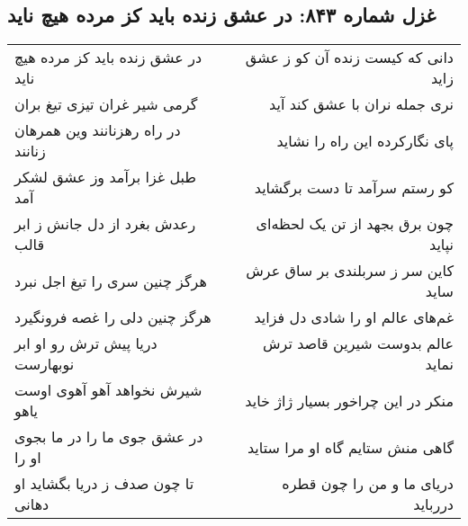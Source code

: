 \begin{center}
\section*{غزل شماره ۸۴۳: در عشق زنده باید کز مرده هیچ ناید}
\label{sec:0843}
\begin{longtable}{l p{0.5cm} r}
در عشق زنده باید کز مرده هیچ ناید
&&
دانی که کیست زنده آن کو ز عشق زاید
\\
گرمی شیر غران تیزی تیغ بران
&&
نری جمله نران با عشق کند آید
\\
در راه رهزنانند وین همرهان زنانند
&&
پای نگارکرده این راه را نشاید
\\
طبل غزا برآمد وز عشق لشکر آمد
&&
کو رستم سرآمد تا دست برگشاید
\\
رعدش بغرد از دل جانش ز ابر قالب
&&
چون برق بجهد از تن یک لحظه‌ای نپاید
\\
هرگز چنین سری را تیغ اجل نبرد
&&
کاین سر ز سربلندی بر ساق عرش ساید
\\
هرگز چنین دلی را غصه فرونگیرد
&&
غم‌های عالم او را شادی دل فزاید
\\
دریا پیش ترش رو او ابر نوبهارست
&&
عالم بدوست شیرین قاصد ترش نماید
\\
شیرش نخواهد آهو آهوی اوست یاهو
&&
منکر در این چراخور بسیار ژاژ خاید
\\
در عشق جوی ما را در ما بجوی او را
&&
گاهی منش ستایم گاه او مرا ستاید
\\
تا چون صدف ز دریا بگشاید او دهانی
&&
دریای ما و من را چون قطره دررباید
\\
\end{longtable}
\end{center}
